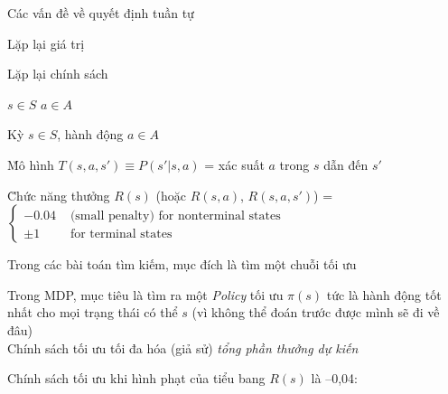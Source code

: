 \documentclass{article}
\begin{document}
\begin{huge}

\sf


\blob Các vấn đề về quyết định tuần tự

\blob Lặp lại giá trị

\blob Lặp lại chính sách



\vspace*{0.3in}

\textwidth
{}





\centerline{%
\textwidth
{} \hspace*{1in} $s \in S$
\textwidth
$a \in A$}

Kỳ $s \in S$, hành động $a \in A$

\u{Mô hình} $T(s,a,s') \equiv P(s'|s,a)$ = xác suất $a$ trong $s$ dẫn đến $s'$

\u{Chức năng thưởng} $R(s)$ (hoặc $R(s,a)$, $R(s,a,s')$)\nl
   = $\left\{\begin{array}{ll} -0.04 & \mbox{ (small penalty) for nonterminal states}\\
                               \pm 1 & \mbox{ for terminal states}\end{array}\right.$



Trong các bài toán tìm kiếm, mục đích là tìm một chuỗi {\em} tối ưu

Trong MDP, mục tiêu là tìm ra một {\em Policy} tối ưu $\pi(s)$\nl
   tức là hành động tốt nhất cho mọi trạng thái có thể $s$ \nl
   (vì không thể đoán trước được mình sẽ đi về đâu)\\
Chính sách tối ưu tối đa hóa (giả sử) {\em tổng phần thưởng dự kiến}

Chính sách tối ưu khi hình phạt của tiểu bang $R(s)$ là --0,04:


\end{huge}
\end{document}

